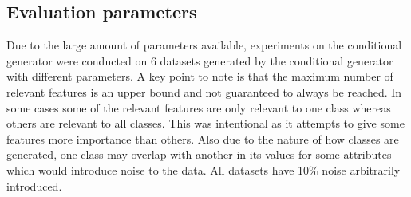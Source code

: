 \subsection{Evaluation parameters}
Due to the large amount of parameters available, experiments on the conditional generator were conducted on 6 datasets generated by the conditional generator with different parameters. A key point to note is that the maximum number of relevant features is an upper bound and not guaranteed to always be reached. In some cases some of the relevant features are only relevant to one class whereas others are relevant to all classes. This was intentional as it attempts to give some features more importance than others. Also due to the nature of how classes are generated, one class may overlap with another in its values for some attributes which would introduce noise to the data. All datasets have 10\% noise arbitrarily introduced.

